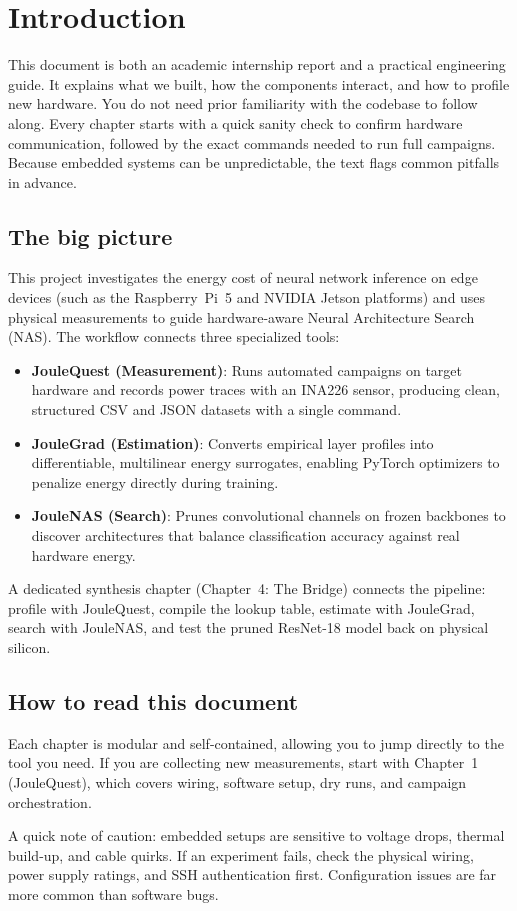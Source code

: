 \chapter*{Introduction}

This document is both an academic internship report and a practical engineering guide. It explains what we built, how the components interact, and how to profile new hardware. You do not need prior familiarity with the codebase to follow along. Every chapter starts with a quick sanity check to confirm hardware communication, followed by the exact commands needed to run full campaigns. Because embedded systems can be unpredictable, the text flags common pitfalls in advance.

\section*{The big picture}

This project investigates the energy cost of neural network inference on edge devices (such as the Raspberry~Pi~5 and NVIDIA Jetson platforms) and uses physical measurements to guide hardware-aware Neural Architecture Search (NAS). The workflow connects three specialized tools:

\begin{itemize}
    \item \textbf{JouleQuest (Measurement)}: Runs automated campaigns on target hardware and records power traces with an INA226 sensor, producing clean, structured CSV and JSON datasets with a single command.
    \item \textbf{JouleGrad (Estimation)}: Converts empirical layer profiles into differentiable, multilinear energy surrogates, enabling PyTorch optimizers to penalize energy directly during training.
    \item \textbf{JouleNAS (Search)}: Prunes convolutional channels on frozen backbones to discover architectures that balance classification accuracy against real hardware energy.
\end{itemize}

A dedicated synthesis chapter (Chapter~4: The Bridge) connects the pipeline: profile with JouleQuest, compile the lookup table, estimate with JouleGrad, search with JouleNAS, and test the pruned ResNet-18 model back on physical silicon.

\section*{How to read this document}

Each chapter is modular and self-contained, allowing you to jump directly to the tool you need. If you are collecting new measurements, start with Chapter~1 (JouleQuest), which covers wiring, software setup, dry runs, and campaign orchestration.

A quick note of caution: embedded setups are sensitive to voltage drops, thermal build-up, and cable quirks. If an experiment fails, check the physical wiring, power supply ratings, and SSH authentication first. Configuration issues are far more common than software bugs.